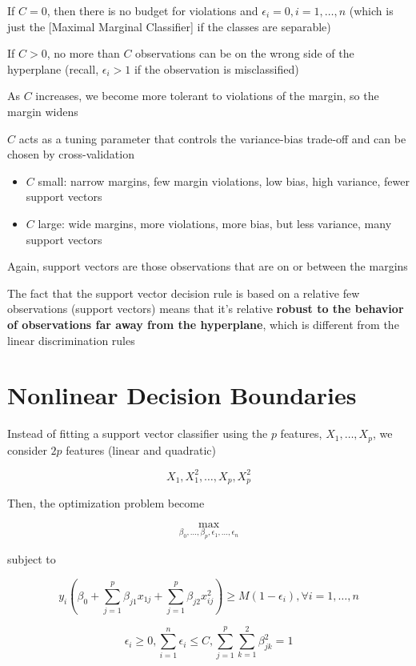 \documentclass[
]{book}
\begin{document}
If \(C = 0\), then there is no budget for violations and \(\epsilon_i = 0, i = 1, \dots, n\) (which is just the {[}Maximal Marginal Classifier{]} if the classes are separable)

If \(C >0\), no more than \(C\) observations can be on the wrong side of the hyperplane (recall, \(\epsilon_i > 1\) if the observation is misclassified)

As \(C\) increases, we become more tolerant to violations of the margin, so the margin widens

\(C\) acts as a tuning parameter that controls the variance-bias trade-off and can be chosen by cross-validation

\begin{itemize}
\item
  \(C\) small: narrow margins, few margin violations, low bias, high variance, fewer support vectors
\item
  \(C\) large: wide margins, more violations, more bias, but less variance, many support vectors
\end{itemize}

Again, support vectors are those observations that are on or between the margins

The fact that the support vector decision rule is based on a relative few observations (support vectors) means that it's relative \textbf{robust to the behavior of observations far away from the hyperplane}, which is different from the linear discrimination rules

\hypertarget{nonlinear-decision-boundaries}{%
\section{Nonlinear Decision Boundaries}\label{nonlinear-decision-boundaries}}

Instead of fitting a support vector classifier using the \(p\) features, \(X_1, \dots, X_p\), we consider \(2p\) features (linear and quadratic)

\[
X_1, X_1^2, \dots, X_p, X^2_p
\]

Then, the optimization problem become

\[
\underset{\beta_0,\dots, \beta_p, \epsilon_1, \dots, \epsilon_n}{\operatorname{max}}
\]

subject to

\[
y_i (\beta_0 + \sum_{j=1}^p \beta_{j1}x_{1j} + \sum_{j=1}^p \beta_{j2} x_{ij}^2) \ge M (1 - \epsilon_i), \forall i = 1, \dots, n
\]

\[
\epsilon_i \ge 0 , \sum_{i=1}^n \epsilon_i \le C, \sum_{j = 1}^p \sum_{k = 1}^2 \beta_{jk}^2 = 1
\]
\end{document}
